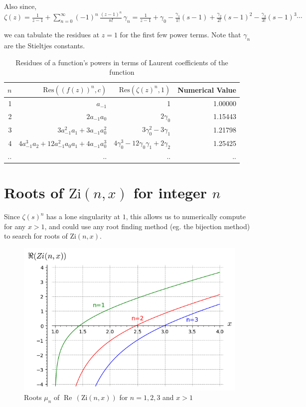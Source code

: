 \documentclass[a4paper,11pt,twoside]{amsart}
\newcommand\Zi{\mathrm{Zi}}
\newcommand\Res{\mathrm{Res}}
\renewcommand\Re{{\operatorname{Re\,}}}
\begin{document}
Also since,\\
$\zeta(z) = \frac{1}{z-1} + \sum\limits_{n=0}^{\infty} (-1)^n\,\frac{(z-1)^n}{n!}\, \gamma_n = \frac{1}{z-1} + \gamma_0 - \frac{\gamma_1}{1!}(s-1) + \frac{\gamma_2}{2!}(s-1)^2 - \frac{\gamma_3}{3!}(s-1)^3 \cdots$

we can tabulate the residues at $z=1$ for the first few power terms. Note that $\gamma_n$ are the Stieltjes constants. 

\begin{table}[H]
  \begin{center}
    \caption{Residues of a function's powers in terms of Laurent coefficients of the function}
    \label{tab:table1}
    \begin{tabular}{r|r|r|r} %
      $n$ & $\Res((f(z))^n,c)$ &  $\Res(\zeta(z)^{n},1)$ & Numerical Value\\
      \hline
      1 &  $a_{-1}$ & 1 & 1.00000\\
      2 &  $2a_{-1}a_{0}$ & $2\gamma_0$ & 1.15443\\
      3 &  $3a_{-1}^2 a_{1} + 3a_{-1} a_{0}^2$ & $3\gamma_0^2-3\gamma_1$ & 1.21798\\
      4 &  $4a_{-1}^3 a_{2} + 12a_{-1}^2 a_{0} a_{1} + 4a_{-1} a_{0}^3$ & $4\gamma_0^3-12\gamma_0\gamma_1 +2\gamma_2$ & 1.25425\\
      .. & .. & .. & ..\\
    \end{tabular}
  \end{center}
\end{table}


\section{Roots of $\Zi(n,x)$ for integer $n$}

Since $\zeta(s)^{n}$ has a lone singularity at $1$, this allows us to numerically compute for any $x>1$, and could use any root finding method (eg. the bijection method) to search for roots of $\Zi(n,x)$.

\begin{figure}[H]
  \includegraphics[width=0.8\linewidth]{RootsZinx.png}
  \caption{Roots $\mu_n$ of $\Re(\Zi(n,x))$ for $n=1,2,3$ and $x > 1$}
\end{figure}
\end{document}
